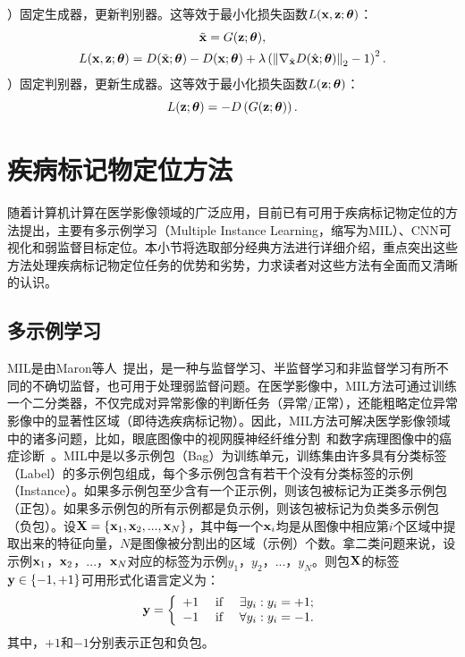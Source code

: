）固定生成器，更新判别器。这等效于最小化损失函数$L(\mathbf{x},\mathbf{z};\mbox{\boldmath $\theta$})$：
\begin{gather}
	\tilde{{\mathbf{x}}} = G({\mathbf{z}};\mbox{\boldmath $\theta$}), \\
	L(\mathbf{x},\mathbf{z};\mbox{\boldmath $\theta$})=D(\tilde{{\mathbf{x}}};\mbox{\boldmath $\theta$})-D({\mathbf{x}};\mbox{\boldmath $\theta$})+\lambda\left(\left\|\nabla_{\hat{\mathbf{x}}} D(\hat{\mathbf{x}};\mbox{\boldmath $\theta$})\right\|_{2}-1\right)^{2}.
\end{gather}
）固定判别器，更新生成器。这等效于最小化损失函数$L(\mathbf{z};\mbox{\boldmath $\theta$})$：
\begin{equation}
	L(\mathbf{z};\mbox{\boldmath $\theta$})=-D\left(G(\mathbf{z};\mbox{\boldmath $\theta$})\right).
\end{equation}
\section{疾病标记物定位方法}\label{sec:related_work}
随着计算机计算在医学影像领域的广泛应用，目前已有可用于疾病标记物定位的方法提出，主要有多示例学习（Multiple Instance Learning，缩写为MIL）、CNN可视化和弱监督目标定位。本小节将选取部分经典方法进行详细介绍，重点突出这些方法处理疾病标记物定位任务的优势和劣势，力求读者对这些方法有全面而又清晰的认识。
\subsection{多示例学习}
MIL是由Maron等人~\cite{maron1998framework}提出，是一种与监督学习、半监督学习和非监督学习有所不同的不确切监督，也可用于处理弱监督问题。在医学影像中，MIL方法可通过训练一个二分类器，不仅完成对异常影像的判断任务（异常/正常），还能粗略定位异常影像中的显著性区域（即待选疾病标记物）。因此，MIL方法可解决医学影像领域中的诸多问题，比如，眼底图像中的视网膜神经纤维分割~\cite{manivannan2017subcategory}和数字病理图像中的癌症诊断~\cite{kandemir2014empowering}。MIL中是以多示例包（Bag）为训练单元，训练集由许多具有分类标签（Label）的多示例包组成，每个多示例包含有若干个没有分类标签的示例（Instance）。如果多示例包至少含有一个正示例，则该包被标记为正类多示例包（正包）。如果多示例包的所有示例都是负示例，则该包被标记为负类多示例包（负包）。设$\mathbf{X}=\{\mathbf{x}_1,\mathbf{x}_2,...,\mathbf{x}_N\}$，其中每一个$\mathbf{x}_i$均是从图像中相应第$i$个区域中提取出来的特征向量，$N$是图像被分割出的区域（示例）个数。拿二类问题来说，设示例${\mathbf{x}_1}$，$\mathbf{x}_2$，...，$\mathbf{x}_N$对应的标签为示例${y_1}$，${y_2}$，...，${y_N}$。则包$\mathbf{X}$的标签$\mathbf{y}\in \{-1,+1\}$可用形式化语言定义为：
\begin{equation}
\mathbf{y}=\left\{\begin{array}{ll}
{+1} & {\text { if } \quad \exists {y}_{i}: {y}_{i}=+1;} \\
{-1} & {\text { if } \quad \forall {y}_{i}: {y}_{i}=-1.}
\end{array}\right.
\end{equation}
其中，$+1$和$-1$分别表示正包和负包。


